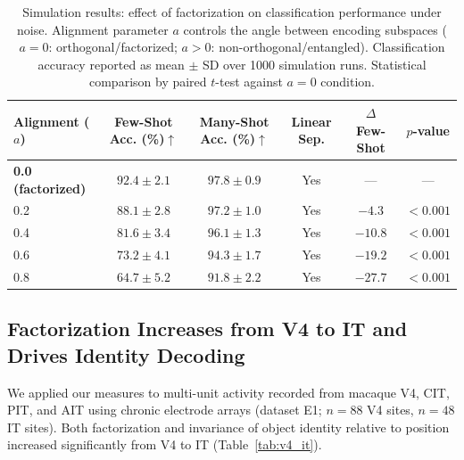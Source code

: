 \documentclass[11pt]{article}
\begin{document}
\begin{table}[H]
\centering
\caption{Simulation results: effect of factorization on classification performance under noise. Alignment parameter $a$ controls the angle between encoding subspaces ($a = 0$: orthogonal/factorized; $a > 0$: non-orthogonal/entangled). Classification accuracy reported as mean $\pm$ SD over 1000 simulation runs. Statistical comparison by paired $t$-test against $a = 0$ condition.}
\label{tab:simulation}
\begin{tabular}{lccccc}
\toprule
\textbf{Alignment ($a$)} & \textbf{Few-Shot Acc. (\%)}$\uparrow$ & \textbf{Many-Shot Acc. (\%)}$\uparrow$ & \textbf{Linear Sep.} & \textbf{$\Delta$ Few-Shot} & \textbf{$p$-value} \\
\midrule
\textbf{0.0 (factorized)} & $\mathbf{92.4 \pm 2.1}$ & $\mathbf{97.8 \pm 0.9}$ & Yes & --- & --- \\
0.2 & $88.1 \pm 2.8$ & $97.2 \pm 1.0$ & Yes & $-4.3$ & $< 0.001$ \\
0.4 & $81.6 \pm 3.4$ & $96.1 \pm 1.3$ & Yes & $-10.8$ & $< 0.001$ \\
0.6 & $73.2 \pm 4.1$ & $94.3 \pm 1.7$ & Yes & $-19.2$ & $< 0.001$ \\
0.8 & $64.7 \pm 5.2$ & $91.8 \pm 2.2$ & Yes & $-27.7$ & $< 0.001$ \\
\bottomrule
\end{tabular}
\end{table}

\subsection{Factorization Increases from V4 to IT and Drives Identity Decoding}

We applied our measures to multi-unit activity recorded from macaque V4, CIT, PIT, and AIT using chronic electrode arrays (dataset E1; $n = 88$ V4 sites, $n = 48$ IT sites). Both factorization and invariance of object identity relative to position increased significantly from V4 to IT (Table~\ref{tab:v4_it}).
\end{document}

